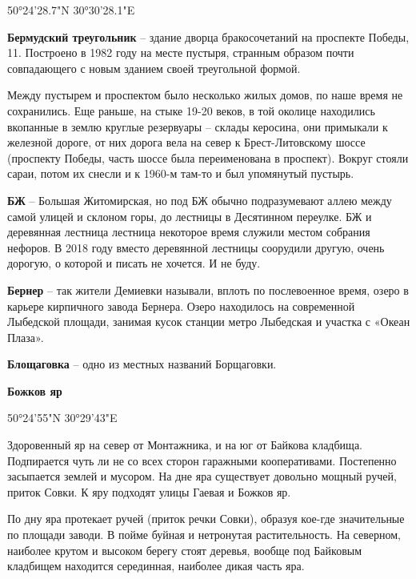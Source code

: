 50°24'28.7"N 30°30'28.1"E\\

\medskip

\textbf{Бермудский треугольник} – здание дворца бракосочетаний на проспекте Победы, 11. Построено в 1982 году на месте пустыря, странным образом почти совпадающего с новым зданием своей треугольной формой.

Между пустырем и проспектом было несколько жилых домов, по наше время не сохранились. Еще раньше, на стыке 19-20 веков, в той околице находились вкопанные в землю круглые резервуары – склады керосина, они примыкали к железной дороге, от них дорога вела на север к Брест-Литовскому шоссе (проспекту Победы, часть шоссе была переименована в проспект). Вокруг стояли сараи, потом их снесли и к 1960-м там-то и был упомянутый пустырь.\\

\medskip

\textbf{БЖ} – Большая Житомирская, но под БЖ обычно подразумевают аллею между самой улицей и склоном горы, до лестницы в Десятинном переулке. БЖ и деревянная лестница лестница некоторое время служили местом собрания нефоров. В 2018 году вместо деревянной лестницы соорудили другую, очень дорогую, о которой и писать не хочется. И не буду.\\

\medskip


\textbf{Бернер} – так жители Демиевки называли, вплоть по послевоенное время, озеро в карьере кирпичного завода Бернера. Озеро находилось на современной Лыбедской площади, занимая кусок станции метро Лыбедская и участка с «Океан Плаза».\\ 

\medskip

\textbf{Блощаговка} – одно из местных названий Борщаговки.\\

\medskip

\textbf{Божков яр} 

50°24'55"N 30°29'43"E

Здоровенный яр на север от Монтажника, и на юг от Байкова кладбища. Подпирается чуть ли не со всех сторон гаражными кооперативами. Постепенно засыпается землей и мусором. На дне яра существует довольно мощный ручей, приток Совки. К яру подходят улицы Гаевая и Божков яр. 

По дну яра протекает ручей (приток речки Совки), образуя кое-где значительные по площади заводи. В пойме буйная и нетронутая растительность. На северном, наиболее крутом и высоком берегу стоят деревья, вообще под Байковым кладбищем находится серединная, наиболее дикая часть яра.

